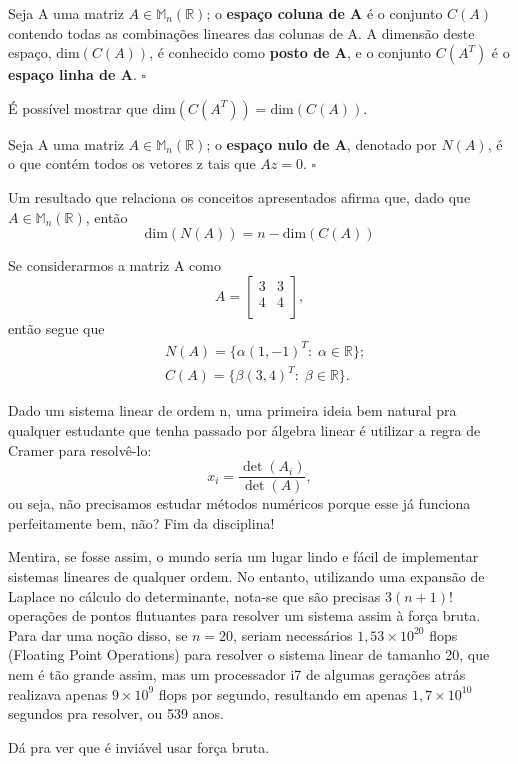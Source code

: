 \documentclass[../numerical_methods.tex]{subfiles}
\begin{document}
\begin{def*}
	Seja A uma matriz \(A\in \mathbb{M}_{n}(\mathbb{R})\); o \textbf{espaço coluna de A} é o conjunto \(C(A)\) contendo todas as combinações lineares das colunas de A. A dimensão deste espaço, \(\mathrm{dim}(C(A))\), é conhecido como \textbf{posto de A}, e o conjunto \(C(A^{T})\) é o \textbf{espaço linha de A}. \(\square\)
\end{def*}
É possível mostrar que \(\mathrm{dim}(C(A^{T})) = \mathrm{dim}(C(A))\).
\begin{def*}
	Seja A uma matriz \(A\in \mathbb{M}_{n}(\mathbb{R})\); o \textbf{espaço nulo de A}, denotado por \(N(A)\), é o que contém todos os vetores z tais que \(Az = 0\). \(\square\)
\end{def*}
Um resultado que relaciona os conceitos apresentados afirma que, dado que \(A\in \mathbb{M}_{n}(\mathbb{R})\), então
\[
	\mathrm{dim}(N(A))=n-\mathrm{dim}(C(A))
\]
\begin{example}
	Se considerarmos a matriz A como
	\[
		A = \begin{bmatrix}
			3 & 3 \\
			4 & 4 \\
		\end{bmatrix},
	\]
	então segue que
	\begin{align*}
		 & N(A)=\{\alpha (1,-1)^{T}:\; \alpha \in \mathbb{R}\}; \\
		 & C(A)=\{\beta (3,4)^{T}:\; \beta \in \mathbb{R}\}.
	\end{align*}
\end{example}

\begin{tcolorbox}[
		skin=enhanced,
		title=Observação,
		fonttitle=\bfseries,
		colframe=black,
		colbacktitle=cyan!75!white,
		colback=cyan!15,
		colbacklower=black,
		coltitle=black,
		drop fuzzy shadow,
	]

	Dado um sistema linear de ordem n, uma primeira ideia bem natural pra qualquer estudante que tenha passado por álgebra linear é utilizar a regra de Cramer para resolvê-lo:
	\[
		x_{i} = \frac{\det{(A_{i})}}{\det{(A)}},
	\]
	ou seja, não precisamos estudar métodos numéricos porque esse já funciona perfeitamente bem, não? Fim da disciplina!

	Mentira, se fosse assim, o mundo seria um lugar lindo e fácil de implementar sistemas lineares de qualquer ordem. No entanto, utilizando uma expansão de Laplace no cálculo do determinante, nota-se que são precisas \(3(n+1)!\) operações de pontos flutuantes para resolver um sistema assim à força bruta.
	Para dar uma noção disso, se \(n=20\), seriam necessários \(1,53 \times 10^{20}\) flops (Floating Point Operations) para resolver o sistema linear de tamanho 20, que nem é tão grande assim, mas um processador i7 de algumas gerações atrás realizava apenas \(9\times 10^{9}\) flops por segundo, resultando em apenas \(1,7\times 10^{10}\) segundos pra resolver, ou 539 anos.

	Dá pra ver que é inviável usar força bruta.
\end{tcolorbox}
\end{document}
